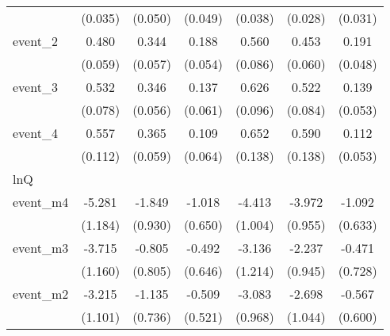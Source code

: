 {\begin{tabular}{l*{6}{c}}
            &     (0.035)         &     (0.050)         &     (0.049)         &     (0.038)         &     (0.028)         &     (0.031)         \\
[1em]
event\_2     &       0.480\sym{***}&       0.344\sym{***}&       0.188\sym{***}&       0.560\sym{***}&       0.453\sym{***}&       0.191\sym{***}\\
            &     (0.059)         &     (0.057)         &     (0.054)         &     (0.086)         &     (0.060)         &     (0.048)         \\
[1em]
event\_3     &       0.532\sym{***}&       0.346\sym{***}&       0.137\sym{*}  &       0.626\sym{***}&       0.522\sym{***}&       0.139\sym{**} \\
            &     (0.078)         &     (0.056)         &     (0.061)         &     (0.096)         &     (0.084)         &     (0.053)         \\
[1em]
event\_4     &       0.557\sym{***}&       0.365\sym{***}&       0.109         &       0.652\sym{***}&       0.590\sym{***}&       0.112\sym{*}  \\
            &     (0.112)         &     (0.059)         &     (0.064)         &     (0.138)         &     (0.138)         &     (0.053)         \\
\hline
lnQ         &                     &                     &                     &                     &                     &                     \\
event\_m4    &      -5.281\sym{***}&      -1.849\sym{*}  &      -1.018         &      -4.413\sym{***}&      -3.972\sym{***}&      -1.092         \\
            &     (1.184)         &     (0.930)         &     (0.650)         &     (1.004)         &     (0.955)         &     (0.633)         \\
[1em]
event\_m3    &      -3.715\sym{**} &      -0.805         &      -0.492         &      -3.136\sym{**} &      -2.237\sym{*}  &      -0.471         \\
            &     (1.160)         &     (0.805)         &     (0.646)         &     (1.214)         &     (0.945)         &     (0.728)         \\
[1em]
event\_m2    &      -3.215\sym{**} &      -1.135         &      -0.509         &      -3.083\sym{**} &      -2.698\sym{**} &      -0.567         \\
            &     (1.101)         &     (0.736)         &     (0.521)         &     (0.968)         &     (1.044)         &     (0.600)         \\

\end{tabular}}
